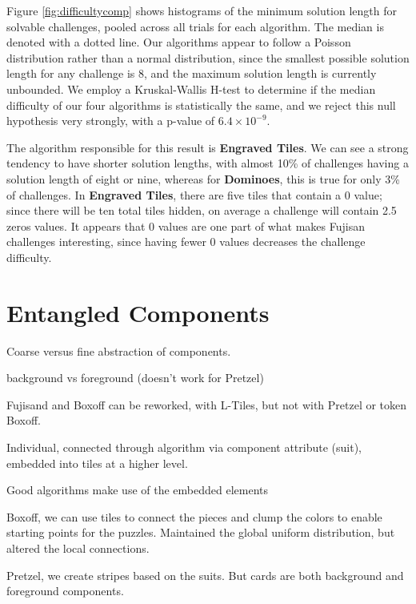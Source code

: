 \documentclass[journal]{IEEEtran}
\begin{document}
Figure \ref{fig:difficultycomp} shows histograms of the minimum solution length for solvable challenges, pooled across all trials for each algorithm. The median is denoted with a dotted line. Our algorithms appear to follow a Poisson distribution rather than a normal distribution, since the smallest possible solution length for any challenge is 8, and the maximum solution length is currently unbounded. We employ a Kruskal-Wallis H-test \cite{KRUSKAL} to determine if the median difficulty of our four algorithms is statistically the same, and we reject this null hypothesis very strongly, with a p-value of $6.4 \times 10^{-9}$.

The algorithm responsible for this result is {\bf Engraved Tiles}. We can see a strong tendency to have shorter solution lengths, with almost 10\% of challenges having a solution length of eight or nine, whereas for {\bf Dominoes}, this is true for only 3\% of challenges. In {\bf Engraved Tiles}, there are five tiles that contain a 0 value; since there will be ten total tiles hidden, on average a challenge will contain 2.5 zeros values. It appears that 0 values are one part of what makes Fujisan challenges interesting, since having fewer 0 values decreases the challenge difficulty.




\section{Entangled Components}

Coarse versus fine abstraction of components. 

background vs foreground (doesn't work for Pretzel)

Fujisand and Boxoff can be reworked, with L-Tiles, but not with Pretzel or token Boxoff.

Individual, connected through algorithm via component attribute (suit), embedded into tiles at a higher level.

Good algorithms make use of the embedded elements



Boxoff, we can use tiles to connect the pieces and clump the colors to enable starting points for the puzzles. Maintained the global uniform distribution, but altered the local connections.

Pretzel, we create stripes based on the suits.  But cards are both background and foreground components.
\end{document}
